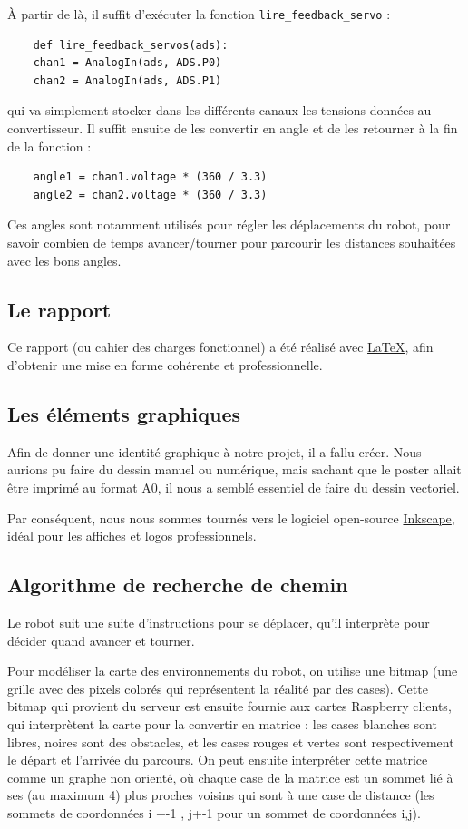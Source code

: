 \documentclass[a4paper,12pt]{report}  %
\begin{document}
À partir de là, il suffit d’exécuter la fonction \texttt{lire\_feedback\_servo} : 

\begin{lstlisting}
	def lire_feedback_servos(ads):
	chan1 = AnalogIn(ads, ADS.P0)
	chan2 = AnalogIn(ads, ADS.P1)
\end{lstlisting}

qui va simplement stocker dans les différents canaux les tensions données au convertisseur. Il suffit ensuite de les convertir en angle et de les retourner à la fin de la fonction :

\begin{lstlisting}
	angle1 = chan1.voltage * (360 / 3.3)
	angle2 = chan2.voltage * (360 / 3.3)
\end{lstlisting}

Ces angles sont notamment utilisés pour régler les déplacements du robot, pour savoir combien de temps avancer/tourner pour parcourir les distances souhaitées avec les bons angles.

\subsection{Le rapport}

Ce rapport (ou cahier des charges fonctionnel) a été réalisé avec \href{https://www.latex-project.org/}{\LaTeX}, afin d'obtenir une mise en forme cohérente et professionnelle. 

\subsection{Les éléments graphiques}

Afin de donner une identité graphique à notre projet, il a fallu créer. Nous aurions pu faire du dessin manuel ou numérique, mais sachant que le poster allait être imprimé au format A0, il nous a semblé essentiel de faire du dessin vectoriel. 

Par conséquent, nous nous sommes tournés vers le logiciel open-source \href{https://inkscape.org/fr/}{Inkscape}, idéal pour les affiches et logos professionnels. 

\subsection{Algorithme de recherche de chemin}
Le robot suit une suite d’instructions pour se déplacer, qu’il interprète pour décider quand avancer et tourner.

Pour modéliser la carte des environnements du robot, on utilise une bitmap (une grille avec des pixels colorés qui représentent la réalité par des cases). Cette bitmap qui provient du serveur est ensuite fournie aux cartes Raspberry clients, qui interprètent la carte pour la convertir en matrice : les cases blanches sont libres, noires sont des obstacles, et les cases rouges et vertes sont respectivement le départ et l’arrivée du parcours. On peut ensuite interpréter cette matrice comme un graphe non orienté, où chaque case de la matrice est un sommet lié à ses (au maximum 4) plus proches voisins qui sont à une case de distance (les sommets de coordonnées i +-1 , j+-1 pour un sommet de coordonnées i,j).
\end{document}
